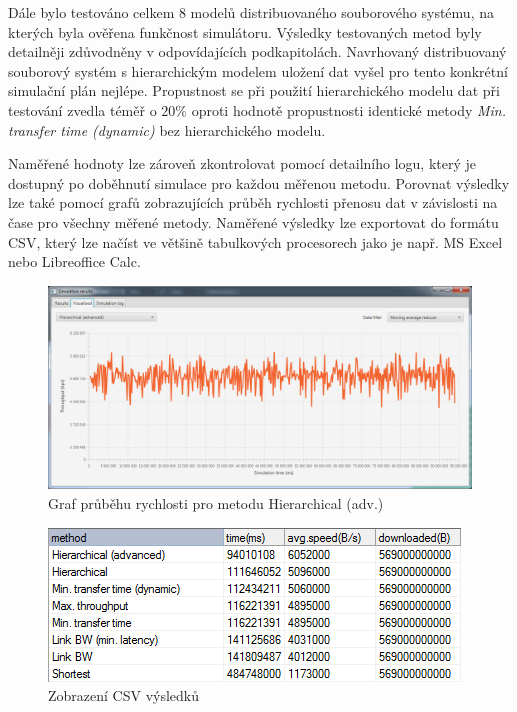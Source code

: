 \documentclass[czech,DP]{thesiskiv}
\begin{document}
Dále bylo testováno celkem 8 modelů distribuovaného souborového systému, na kterých byla ověřena funkčnost simulátoru. Výsledky testovaných metod byly detailněji zdůvodněny v odpovídajících podkapitolách. Navrhovaný distribuovaný souborový systém s hierarchickým modelem uložení dat vyšel pro tento konkrétní simulační plán nejlépe. Propustnost se při použití hierarchického modelu dat při testování zvedla téměř o $20\%$ oproti hodnotě propustnosti identické metody \textit{Min. transfer time (dynamic)} bez hierarchického modelu.

Naměřené hodnoty lze zároveň zkontrolovat pomocí detailního logu, který je dostupný po doběhnutí simulace pro každou měřenou metodu. Porovnat výsledky lze také pomocí grafů zobrazujících průběh rychlosti přenosu dat v závislosti na čase pro všechny měřené metody. Naměřené výsledky lze exportovat do formátu CSV, který lze načíst ve většině tabulkových procesorech jako je např. MS Excel nebo Libreoffice Calc. 

\begin{figure}[H]
\centering
	\includegraphics[width=\textwidth]{img/test/mereni_graf_hie.png}
\caption{Graf průběhu rychlosti pro metodu Hierarchical (adv.)}
\label{fig:mereni_graf_hie}
\end{figure}

\begin{figure}[H]
\centering
	\includegraphics{img/test/tabulka_vysledky.png}
\caption{Zobrazení CSV výsledků}
\label{fig:tabulka_vysledky}
\end{figure}
\end{document}
